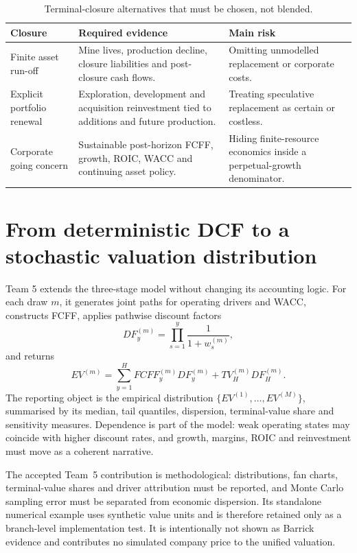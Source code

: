 \begin{table}[H]
\centering
\caption{Terminal-closure alternatives that must be chosen, not blended.}
\label{tab:terminal-closure-alternatives}
\small
\renewcommand{\arraystretch}{1.12}
\begin{tabularx}{\textwidth}{@{}p{3.00cm}X X@{}}
\toprule
Closure & Required evidence & Main risk \\
\midrule
Finite asset run-off & Mine lives, production decline, closure liabilities and
post-closure cash flows. & Omitting unmodelled replacement or corporate costs. \\
Explicit portfolio renewal & Exploration, development and acquisition
reinvestment tied to additions and future production. & Treating speculative
replacement as certain or costless. \\
Corporate going concern & Sustainable post-horizon FCFF, growth, ROIC, WACC
and continuing asset policy. & Hiding finite-resource economics inside a
perpetual-growth denominator. \\
\bottomrule
\end{tabularx}
\end{table}

\section{From deterministic DCF to a stochastic valuation distribution}

Team 5 extends the three-stage model without changing its accounting logic.
For each draw \(m\), it generates joint paths for operating drivers and WACC,
constructs FCFF, applies pathwise discount factors
\begin{equation}
DF_y^{(m)}=\prod_{s=1}^{y}\frac{1}{1+w_s^{(m)}},
\end{equation}
and returns
\begin{equation}
EV^{(m)}=\sum_{y=1}^{H}FCFF_y^{(m)}DF_y^{(m)}
       +TV_H^{(m)}DF_H^{(m)}.
\end{equation}
The reporting object is the empirical distribution
\(\{EV^{(1)},\ldots,EV^{(M)}\}\), summarised by its median, tail quantiles,
dispersion, terminal-value share and sensitivity measures. Dependence is part
of the model: weak operating states may coincide with higher discount rates,
and growth, margins, ROIC and reinvestment must move as a coherent narrative.

The accepted Team~5 contribution is methodological: distributions, fan
charts, terminal-value shares and driver attribution must be reported, and
Monte Carlo sampling error must be separated from economic dispersion. Its
standalone numerical example uses synthetic value units and is therefore
retained only as a branch-level implementation test. It is intentionally not
shown as Barrick evidence and contributes no simulated company price to the
unified valuation.

